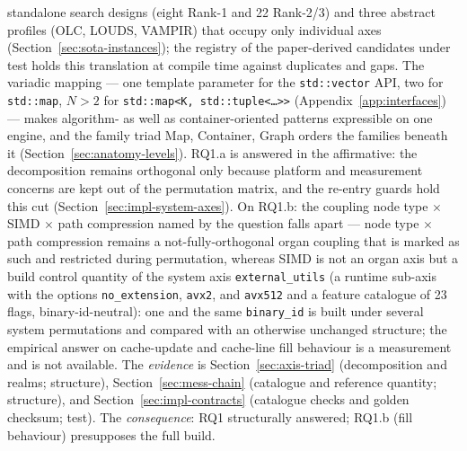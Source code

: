 \begin{nurlang}
standalone search designs (eight Rank-1 and 22 Rank-2/3) and three abstract profiles (OLC, LOUDS,
VAMPIR) that occupy only individual axes (Section~\ref{sec:sota-instances}); the registry of the
paper-derived candidates under test holds this translation at compile time against duplicates and gaps. The variadic
mapping --- one template parameter for the \texttt{std::vector} API, two for \texttt{std::map},
$N>2$ for \texttt{std::map<K,\,std::tuple<\ldots>>} (Appendix~\ref{app:interfaces}) --- makes
algorithm- as well as container-oriented patterns expressible on one engine, and the family triad
Map, Container, Graph orders the families beneath it (Section~\ref{sec:anatomy-levels}). RQ1.a is
answered in the affirmative: the decomposition remains orthogonal only because platform and
measurement concerns are kept out of the permutation matrix, and the re-entry guards hold this cut
(Section~\ref{sec:impl-system-axes}). On RQ1.b: the coupling node type $\times$ SIMD $\times$ path
compression named by the question falls apart --- node type $\times$ path compression remains a
not-fully-orthogonal organ coupling that is marked as such and restricted during permutation,
whereas SIMD is not an organ axis but a build control quantity of the system axis
\texttt{external\_utils} (a runtime sub-axis with the options \texttt{no\_extension},
\texttt{avx2}, and \texttt{avx512} and a feature catalogue of 23 flags, binary-id-neutral): one and
the same \texttt{binary\_id} is built under several system permutations and compared with an
otherwise unchanged structure; the empirical answer on cache-update and cache-line fill behaviour
is a measurement and is not available. The \emph{evidence} is Section~\ref{sec:axis-triad}
(decomposition and realms; structure), Section~\ref{sec:mess-chain} (catalogue and reference
quantity; structure), and Section~\ref{sec:impl-contracts} (catalogue checks and golden checksum;
test). The \emph{consequence}: RQ1 structurally answered; RQ1.b (fill behaviour) presupposes the
full build.
\end{nurlang}
